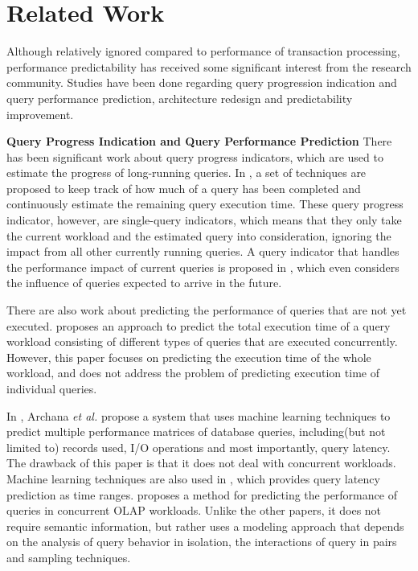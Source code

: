 
\section{Related Work}
Although relatively ignored compared to performance of transaction processing,
performance predictability has received some significant interest from the
research community. Studies have been done regarding query progression
indication and query performance prediction, architecture redesign and
predictability improvement.

\textbf{Query Progress Indication and Query Performance Prediction} There has
been significant work \cite{chaudhuri:can, chaudhuri:estimating, luo:toward, 
luo:increasing, luo:multi} about query progress indicators, which are used to
estimate the progress of long-running queries. In \cite{chaudhuri:can, 
chaudhuri:estimating, luo:toward, luo:increasing}, a set of techniques are
proposed to keep track of how much of a query has been completed and 
continuously estimate the remaining query execution time. These query progress
indicator, however, are single-query indicators, which means that they only
take the current workload and the estimated query into consideration, ignoring
the impact from all other currently running queries. A query indicator that
handles the performance impact of current queries is proposed in
\cite{luo:multi}, which even considers the influence of queries expected to
arrive in the future.

There are also work \cite{ahmad:interaction, duggan:performance, gupta:pqr,
ganapathi:predicting} about predicting the performance of queries that are not
yet executed. \cite{ahmad:interaction} proposes an approach to predict the
total execution time of a query workload consisting of different types of
queries that are executed concurrently. However, this paper focuses on
predicting the execution time of the whole workload, and does not address the
problem of predicting execution time of individual queries.

In \cite{ganapathi:predicting}, Archana \textit{et al.} propose a system that
uses machine learning techniques to predict multiple performance matrices of
database queries, including(but not limited to) records used, I/O operations
and most importantly, query latency. The drawback of this paper is that it
does not deal with concurrent workloads. Machine learning techniques are also
used in \cite{gupta:pqr}, which provides query latency prediction as time
ranges. \cite{duggan:performance} proposes a method for predicting the
performance of queries in concurrent OLAP workloads. Unlike the other papers,
it does not require semantic information, but rather uses a modeling approach
that depends on the analysis of query behavior in isolation, the interactions
of query in pairs and sampling techniques.

